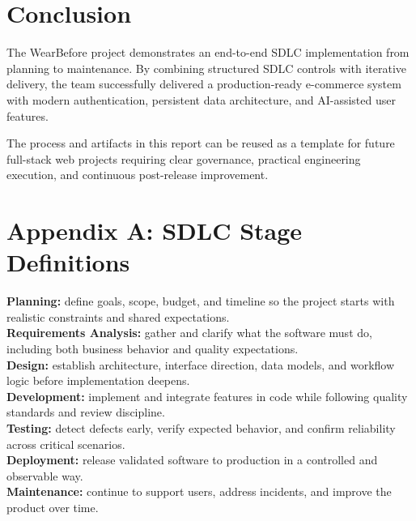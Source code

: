 \documentclass[12pt,a4paper]{article}
\begin{document}
\section{Conclusion}
The WearBefore project demonstrates an end-to-end SDLC implementation from planning to maintenance. By combining structured SDLC controls with iterative delivery, the team successfully delivered a production-ready e-commerce system with modern authentication, persistent data architecture, and AI-assisted user features.

The process and artifacts in this report can be reused as a template for future full-stack web projects requiring clear governance, practical engineering execution, and continuous post-release improvement.

\section*{Appendix A: SDLC Stage Definitions}
\textbf{Planning:} define goals, scope, budget, and timeline so the project starts with realistic constraints and shared expectations.\\
\textbf{Requirements Analysis:} gather and clarify what the software must do, including both business behavior and quality expectations.\\
\textbf{Design:} establish architecture, interface direction, data models, and workflow logic before implementation deepens.\\
\textbf{Development:} implement and integrate features in code while following quality standards and review discipline.\\
\textbf{Testing:} detect defects early, verify expected behavior, and confirm reliability across critical scenarios.\\
\textbf{Deployment:} release validated software to production in a controlled and observable way.\\
\textbf{Maintenance:} continue to support users, address incidents, and improve the product over time.
\end{document}
